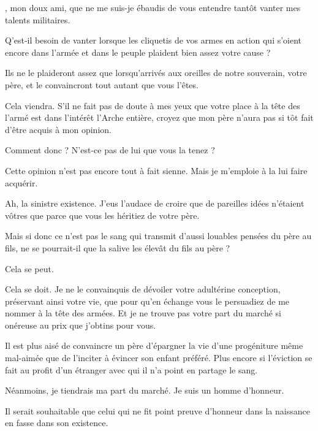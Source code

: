\begin{drama}
  \generalspeaks \elena, mon doux ami, que ne me suis-je ébaudis de vous entendre tantôt vanter mes talents militaires.

  \elenaspeaks Q’est-il besoin de vanter lorsque les cliquetis de vos armes en action qui s’oient encore dans l’armée et dans le peuple plaident bien assez votre cause ?

  \generalspeaks Ils  ne le plaideront assez que lorsqu’arrivés aux oreilles de notre souverain, votre père, et le convaincront tout autant que vous l’êtes.

  \elenaspeaks Cela viendra. S’il ne fait pas de doute à mes yeux que votre place à la tête des l’armé est dans l’intérêt l’Arche entière, croyez que mon père n’aura pas si tôt fait d’être acquis à mon opinion.

  \generalspeaks Comment donc ? N’est-ce pas de lui que vous la tenez ?


  \elenaspeaks Cette opinion n’est pas encore tout à fait sienne. Mais je m’emploie à la lui faire acquérir.

  \generalspeaks 
  Ah, la sinistre existence. J’eus l’audace de croire que de pareilles idées n’étaient vôtres que parce que vous les héritiez de votre père.

  Mais si donc ce n’est pas le sang qui transmit d’aussi louables pensées du père au fils, ne se pourrait-il que la salive les élevât du fils au père ?

  \elenaspeaks Cela se peut.

  \generalspeaks Cela se doit. Je ne le convainquis de dévoiler votre adultérine conception, préservant ainsi votre vie, que pour qu’en échange vous le persuadiez de me nommer à la tête des armées. Et je ne trouve pas votre part du marché si onéreuse au prix que j’obtins pour vous.

  \elenaspeaks
  Il est plus aisé de convaincre un père d’épargner la vie d’une progéniture même mal-aimée que de l’inciter à évincer son enfant préféré. Plus encore si l’éviction se fait au profit d’un étranger avec qui il n’a point en partage le sang.

  Néanmoins, je tiendrais ma part du marché. Je suis un homme d’honneur.

  \generalspeaks Il serait souhaitable que celui qui ne fit point preuve d’honneur dans la naissance en fasse dans son existence.

\end{drama}


